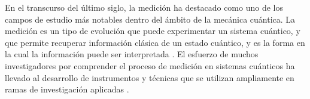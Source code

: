 \documentclass[12pt,oneside]{book}\raggedbottom{} %
\begin{document}
\begin{sloppypar}
{{%








En el transcurso del último siglo, la medición ha destacado como uno de los campos de estudio más notables dentro del ámbito de la mecánica cuántica. La medición es un tipo de evolución que puede experimentar un sistema cuántico, y que permite recuperar información clásica de un estado cuántico, y es la forma en la cual la información puede ser interpretada {\cite{wilde2011classical}}. El esfuerzo de muchos investigadores por comprender el proceso de medición en sistemas cuánticos ha llevado al desarrollo de instrumentos y técnicas que se utilizan ampliamente en ramas de investigación aplicadas {\cite{de2019introduction}}. %




}}
\end{sloppypar}
\end{document}
